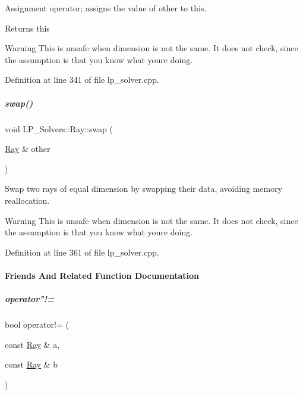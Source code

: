 Assignment operator; assigns the value of {\ttfamily other} to {\ttfamily this}. 

\begin{DoxyReturn}{Returns}
{\ttfamily this} 
\end{DoxyReturn}
\begin{DoxyWarning}{Warning}
This is unsafe when dimension is not the same. It does not check, since the assumption is that you know what you\textquotesingle{}re doing. 
\end{DoxyWarning}


Definition at line 341 of file lp\+\_\+solver.\+cpp.

\mbox{\label{group___c_l_s_solvers_acea89ef5df0792e64ce9003ad19913d4}} 
\subparagraph{\texorpdfstring{swap()}{swap()}}
{\footnotesize\ttfamily void L\+P\+\_\+\+Solvers\+::\+Ray\+::swap (\begin{DoxyParamCaption}\item[{\hyperlink{group___c_l_s_solvers_class_l_p___solvers_1_1_ray}{Ray} \&}]{other }\end{DoxyParamCaption})}



Swap two rays of equal dimension by swapping their data, avoiding memory reallocation. 

\begin{DoxyWarning}{Warning}
This is unsafe when dimension is not the same. It does not check, since the assumption is that you know what you\textquotesingle{}re doing. 
\end{DoxyWarning}


Definition at line 361 of file lp\+\_\+solver.\+cpp.



\paragraph{Friends And Related Function Documentation}
\mbox{\label{group___c_l_s_solvers_a79435f27d182af0ad5dda3646d24ecd8}} 
\subparagraph{\texorpdfstring{operator"!=}{operator!=}}
{\footnotesize\ttfamily bool operator!= (\begin{DoxyParamCaption}\item[{const \hyperlink{group___c_l_s_solvers_class_l_p___solvers_1_1_ray}{Ray} \&}]{a,  }\item[{const \hyperlink{group___c_l_s_solvers_class_l_p___solvers_1_1_ray}{Ray} \&}]{b }\end{DoxyParamCaption})\hspace{0.3cm}{\ttfamily [friend]}}



